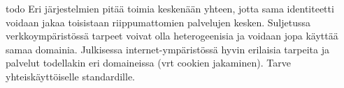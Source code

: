 \documentclass[finnish,gradu]{tktltiki}
\begin{document}
  todo
  Eri järjestelmien pitää toimia keskenään yhteen, jotta sama identiteetti voidaan jakaa toisistaan riippumattomien palvelujen kesken. Suljetussa verkkoympäristössä tarpeet voivat olla heterogeenisia ja voidaan jopa käyttää samaa domainia. Julkisessa internet-ympäristössä hyvin erilaisia tarpeita ja palvelut todellakin eri domaineissa (vrt cookien jakaminen). Tarve yhteiskäyttöiselle standardille.








\end{document}
